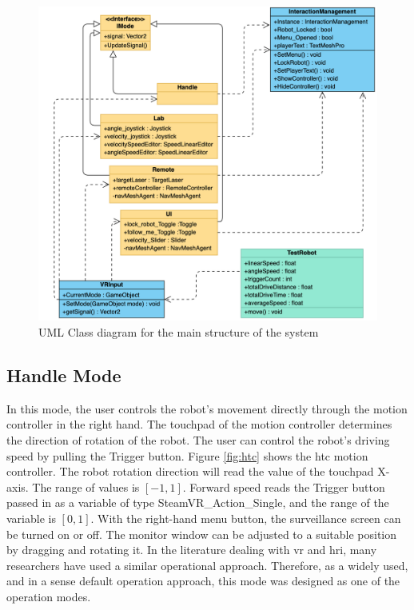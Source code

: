 \begin{figure}[htbp]
    \centering
    \includegraphics[width=\textwidth]{graphics/uml.png}
    \caption{UML Class diagram for the main structure of the system}
    \label{fig:uml}
\end{figure}

\subsection{Handle Mode}
In this mode, the user controls the robot's movement directly through the motion controller in the right hand. The touchpad of the motion controller determines the direction of rotation of the robot. The user can control the robot's driving speed by pulling the Trigger button. Figure \ref{fig:htc} shows the \gls{htc} motion controller. The robot rotation direction will read the value of the touchpad X-axis. The range of values is $[-1,1]$. Forward speed reads the Trigger button passed in as a variable of type SteamVR\_Action\_Single, and the range of the variable is $[0,1]$. With the right-hand menu button, the surveillance screen can be turned on or off. The monitor window can be adjusted to a suitable position by dragging and rotating it. In the literature dealing with \gls{vr} and \gls{hri}, many researchers have used a similar operational approach. Therefore, as a widely used, and in a sense default operation approach, this mode was designed as one of the operation modes.

